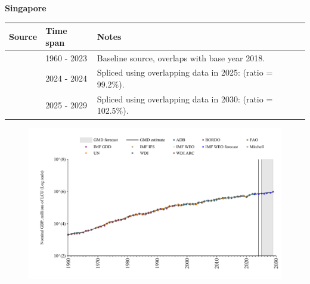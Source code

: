 \documentclass[12pt,a4paper,landscape]{article}
\begin{document}
\begin{adjustbox}{max totalsize={\paperwidth}{\paperheight},center}
\begin{minipage}[t][\textheight][t]{\textwidth}
\vspace*{0.5cm}
{}
\begin{center}
{\Large\bfseries Singapore}
\end{center}
\vspace{0.5cm}
\begin{table}[H]
\centering
\small
\begin{tabular}{|l|l|l|}
\hline
\textbf{Source} & \textbf{Time span} & \textbf{Notes} \\
\hline
\rowcolor{white}\cite{WDI}& 1960 - 2023 &Baseline source, overlaps with base year 2018.\\
\rowcolor{lightgray}\cite{IMF_IFS}& 2024 - 2024 &Spliced using overlapping data in 2025: (ratio = 99.2\%).\\
\rowcolor{white}\cite{IMF_WEO_forecast}& 2025 - 2029 &Spliced using overlapping data in 2030: (ratio = 102.5\%).\\
\hline
\end{tabular}
\end{table}
\begin{figure}[H]
\centering
\includegraphics[width=\textwidth,height=0.6\textheight,keepaspectratio]{graphs/SGP_nGDP.pdf}
\end{figure}
\end{minipage}
\end{adjustbox}
\end{document}
